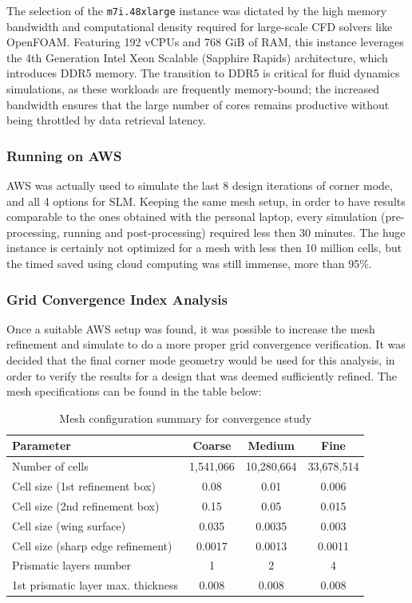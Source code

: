 \documentclass[12pt,a4paper]{article}
\begin{document}
The selection of the \texttt{m7i.48xlarge} instance was dictated by the high memory bandwidth and computational density required for large-scale CFD solvers like OpenFOAM. Featuring 192 vCPUs and 768 GiB of RAM, this instance leverages the 4th Generation Intel Xeon Scalable (Sapphire Rapids) architecture, which introduces DDR5 memory. The transition to DDR5 is critical for fluid dynamics simulations, as these workloads are frequently memory-bound; the increased bandwidth ensures that the large number of cores remains productive without being throttled by data retrieval latency.

\subsubsection{Running on AWS}
AWS was actually used to simulate the last 8 design iterations of corner mode, and all 4 options for SLM. Keeping the same mesh setup, in order to have results comparable to the ones obtained with the personal laptop, every simulation (pre-processing, running and post-processing) required less then 30 minutes. The huge instance is certainly not optimized for a mesh with less then 10 million cells, but the timed saved using cloud computing was still immense, more than 95\%.

\subsubsection{Grid Convergence Index Analysis}
Once a suitable AWS setup was found, it was possible to increase the mesh refinement and simulate to do a more proper grid convergence verification. It was decided that the final corner mode geometry would be used for this analysis, in order to verify the results for a design that was deemed sufficiently refined. The mesh specifications can be found in the table below:

\begin{table}[H]
\centering
\begin{tabular}{@{}lccc@{}}
\toprule
\textbf{Parameter} & \textbf{Coarse} & \textbf{Medium} & \textbf{Fine} \\
\midrule
Number of cells & 1,541,066 & 10,280,664 & 33,678,514 \\
Cell size (1st refinement box) & 0.08 & 0.01 & 0.006 \\
Cell size (2nd refinement box) & 0.15 & 0.05 & 0.015 \\
Cell size (wing surface) & 0.035 & 0.0035 & 0.003 \\
Cell size (sharp edge refinement) & 0.0017 & 0.0013 & 0.0011 \\
Prismatic layers number & 1 & 2 & 4 \\
1st prismatic layer max. thickness & 0.008 & 0.008 & 0.008 \\
\bottomrule
\end{tabular}
\caption{Mesh configuration summary for convergence study}
\end{table}
\end{document}
